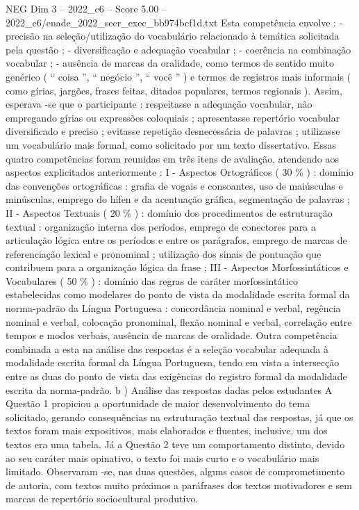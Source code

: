 \begin{textsample}{NEG Dim 3 – 2022\_c6 – Score 5.00 – 2022\_c6/enade\_2022\_secr\_exec\_bb974bcf1d.txt}
Esta competência envolve : - precisão na seleção/utilização do vocabulário relacionado à temática solicitada pela questão ; - diversificação e adequação vocabular ; - coerência na combinação vocabular ; - ausência de marcas da oralidade, como termos de sentido muito genérico ( “ coisa ”, “ negócio ”, “ você ” ) e termos de registros mais informais ( como gírias, jargões, frases feitas, ditados populares, termos regionais ).
Assim, esperava -se que o participante : respeitasse a adequação vocabular, não empregando gírias ou expressões coloquiais ; apresentasse repertório vocabular diversificado e preciso ; evitasse repetição desnecessária de palavras ; utilizasse um vocabulário mais formal, como solicitado por um texto dissertativo.
Essas quatro competências foram reunidas em três itens de avaliação, atendendo aos aspectos explicitados anteriormente : I - Aspectos Ortográficos ( 30 \% ) : domínio das convenções ortográficas : grafia de vogais e consoantes, uso de maiúsculas e minúsculas, emprego do hífen e da acentuação gráfica, segmentação de palavras ; II - Aspectos Textuais ( 20 \% ) : domínio dos procedimentos de estruturação textual : organização interna dos períodos, emprego de conectores para a articulação lógica entre os períodos e entre os parágrafos, emprego de marcas de referenciação lexical e pronominal ; utilização dos sinais de pontuação que contribuem para a organização lógica da frase ; III - Aspectos Morfossintáticos e Vocabulares ( 50 \% ) : domínio das regras de caráter morfossintático estabelecidas como modelares do ponto de vista da modalidade escrita formal da norma-padrão da Língua Portuguesa : concordância nominal e verbal, regência nominal e verbal, colocação pronominal, flexão nominal e verbal, correlação entre tempos e modos verbais, ausência de marcas de oralidade.
Outra competência combinada a esta na análise das respostas é a seleção vocabular adequada à modalidade escrita formal da Língua Portuguesa, tendo em vista a intersecção entre as duas do ponto de vista das exigências do registro formal da modalidade escrita da norma-padrão. b ) Análise das respostas dadas pelos estudantes A Questão 1 propiciou a oportunidade de maior desenvolvimento do tema solicitado, gerando consequências na estruturação textual das respostas, já que os textos foram mais expositivos, mais elaborados e fluentes, inclusive, um dos textos era uma tabela.
Já a Questão 2 teve um comportamento distinto, devido ao seu caráter mais opinativo, o texto foi mais curto e o vocabulário mais limitado.
Observaram -se, nas duas questões, alguns casos de comprometimento de autoria, com textos muito próximos a paráfrases dos textos motivadores e sem marcas de repertório sociocultural produtivo.

\end{textsample}

